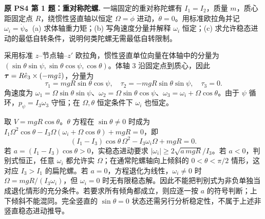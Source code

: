 \begin{example}
\textbf{原 PS4 第 1 题：重对称陀螺.} 
一端固定的重对称陀螺有 $I_1=I_2$，质量 $m$，质心距固定点 $R$，绕惯性竖直轴以恒定 $\Omega=\dot\phi$ 进动，$\dot\theta=0$。用标准欧拉角并记 $\omega_i=\dot\psi$。(a) 求体轴重力矩；(b) 写角速度分量并解释 $\omega_i$ 恒定；(c) 求允许稳态进动的最低自转条件，说明何类陀螺无需最低自转限制。
\end{example}
\begin{solution}
采用标准 $z$--节点轴--$z'$ 欧拉角，惯性竖直单位向量在体轴中的分量为 $(\sin\theta\sin\psi,\sin\theta\cos\psi,\cos\theta)$。体轴 $3$ 沿固定点到质心，因此 $\boldsymbol{\tau}=R\hat e_3\times(-mg\hat z)$，分量为
\[
 \tau_1=mgR\sin\theta\cos\psi,\quad
 \tau_2=-mgR\sin\theta\sin\psi,\quad\tau_3=0.
\]
角速度为 $\omega_1=\Omega\sin\theta\sin\psi$、$\omega_2=\Omega\sin\theta\cos\psi$、$\omega_3=\omega_i+\Omega\cos\theta$。由于 $\psi$ 循环，$p_\psi=I_3\omega_3$ 守恒；在 $\Omega,\theta$ 恒定条件下 $\omega_i$ 也恒定。

取 $V=mgR\cos\theta$。$\theta$ 方程在 $\sin\theta\ne0$ 时成为 $I_1\Omega^2\cos\theta-I_3\Omega(\omega_i+\Omega\cos\theta)+mgR=0$，即
\[
 (I_1-I_3)\cos\theta\,\Omega^2-I_3\omega_i\Omega+mgR=0.
\]
若 $a=(I_1-I_3)\cos\theta>0$，实稳态进动要求 $|\omega_i|\ge2\sqrt{a\,mgR}/I_3$。若 $a<0$，判别式恒正，任意 $\omega_i$ 都允许实 $\Omega$；在通常陀螺轴向上倾斜的 $0<\theta<\pi/2$ 情形，这对应 $I_3>I_1$ 的扁陀螺。若 $a=0$，方程退化为线性，$\omega_i\ne0$ 时 $\Omega=mgR/(I_3\omega_i)$，但 $\omega_i=0$ 时无有限稳态解。因此不能把判别式为非负单独当成退化情形的充分条件。若要求所有倾角都成立，则应逐一按 $a$ 的符号判断；上下倾斜不能混同。完全竖直的 $\sin\theta=0$ 状态还需另行分析稳定性，不属于上述非竖直稳态进动推导。
\end{solution}

